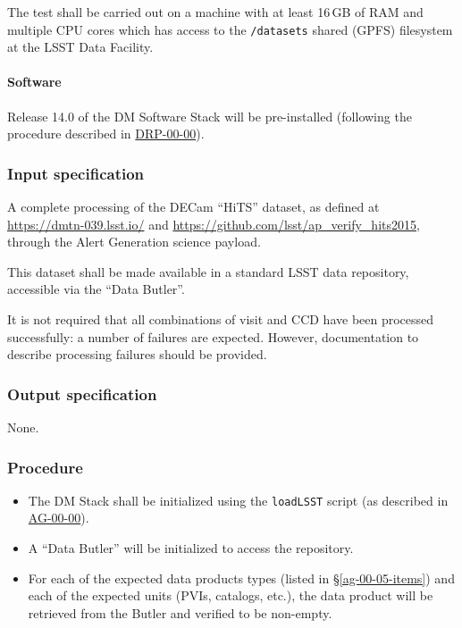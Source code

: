 The test shall be carried out on a machine with at least 16\,GB of RAM and
multiple CPU cores which has access to the \texttt{/datasets} shared (GPFS)
filesystem at the LSST Data Facility.

\paragraph{Software}

Release 14.0 of the DM Software Stack will be pre-installed (following the
procedure described in \hyperref[drp-00-00]{DRP-00-00}).

\subsubsection{Input specification}

A complete processing of the DECam ``HiTS'' dataset, as defined at
\url{https://dmtn-039.lsst.io/} and
\url{https://github.com/lsst/ap_verify_hits2015}, through the Alert
Generation science payload.

This dataset shall be made available in a standard LSST data repository,
accessible via the ``Data Butler''.

It is not required that all combinations of visit and CCD have been processed
successfully: a number of failures are expected. However, documentation to
describe processing failures should be provided.

\subsubsection{Output specification}

None.

\subsubsection{Procedure}

\begin{itemize}

  \item{The DM Stack shall be initialized using the \texttt{loadLSST} script
  (as described in \hyperref[ag-00-00]{AG-00-00}).}

  \item{A ``Data Butler'' will be initialized to access the repository.}

  \item{For each of the expected data products types (listed in \S\ref{ag-00-05-items})
  and each of the expected units (PVIs, catalogs, etc.), the data product will be
  retrieved from the Butler and verified to be non-empty.}

\end{itemize}
